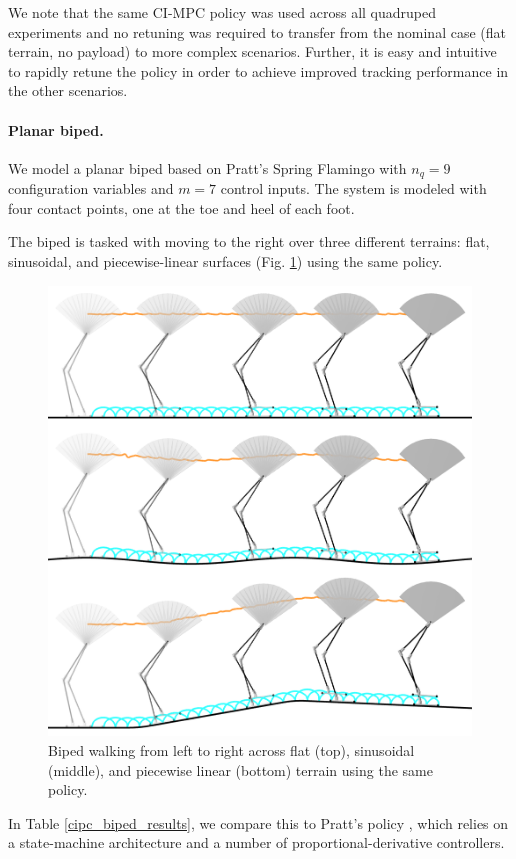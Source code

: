 We note that the same CI-MPC policy was used across all quadruped experiments and no retuning was required to transfer from the nominal case (flat terrain, no payload) to more complex scenarios. Further, it is easy and intuitive to rapidly retune the policy in order to achieve improved tracking performance in the 
other scenarios.

\paragraph{Planar biped.}
We model a planar biped based on Pratt's Spring Flamingo \cite{pratt2000thesis} with $n_q = 9$ configuration variables and $m = 7$ control inputs. The system is modeled with four contact points, one at the toe and heel of each foot.

The biped is tasked with moving to the right over three different terrains: flat, sinusoidal, and piecewise-linear surfaces (Fig. \ref{cipc_biped_tracking}) using the same policy. 

\begin{figure}[H]
	\centering
	\includegraphics[width=.45\textwidth]{ci_pc/flamingo_ghost.png}
	\caption[Planar biped locomotion over unmodeled terrain]{Biped walking from left to right across flat (top), sinusoidal (middle), and piecewise linear (bottom) terrain using the same policy.}
	\label{cipc_biped_tracking}
\end{figure}

In Table \ref{cipc_biped_results}, we compare this to Pratt's policy \cite{pratt2000thesis}, which relies on a state-machine architecture and a number of proportional-derivative controllers. 

